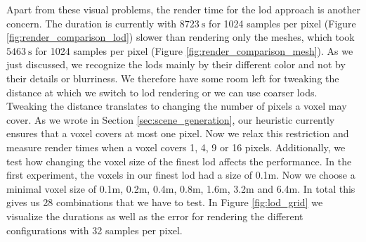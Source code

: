 Apart from these visual problems, the render time for the \ac{lod} approach is another concern.
The duration is currently with $\SI{8723}{\s}$ for 1024 samples per pixel (Figure \ref{fig:render_comparison_lod}) slower than rendering only the meshes, which took $\SI{5463}{\s}$ for 1024 samples per pixel (Figure \ref{fig:render_comparison_mesh}).
As we just discussed, we recognize the \acsp{lod} mainly by their different color and not by their details or blurriness.
We therefore have some room left for tweaking the distance at which we switch to \ac{lod} rendering or we can use coarser \acsp{lod}.
Tweaking the distance translates to changing the number of pixels a voxel may cover.
As we wrote in Section \ref{sec:scene_generation}, our heuristic currently ensures that a voxel covers at most one pixel.
Now we relax this restriction and measure render times when a voxel covers 1, 4, 9 or 16 pixels.
Additionally, we test how changing the voxel size of the finest \ac{lod} affects the performance.
In the first experiment, the voxels in our finest \ac{lod} had a size of 0.1m.
Now we choose a minimal voxel size of 0.1m, 0.2m, 0.4m, 0.8m, 1.6m, 3.2m and 6.4m.
In total this gives us 28 combinations that we have to test.
In Figure \ref{fig:lod_grid} we visualize the durations as well as the \FLIP error for rendering the different configurations with 32 samples per pixel.
